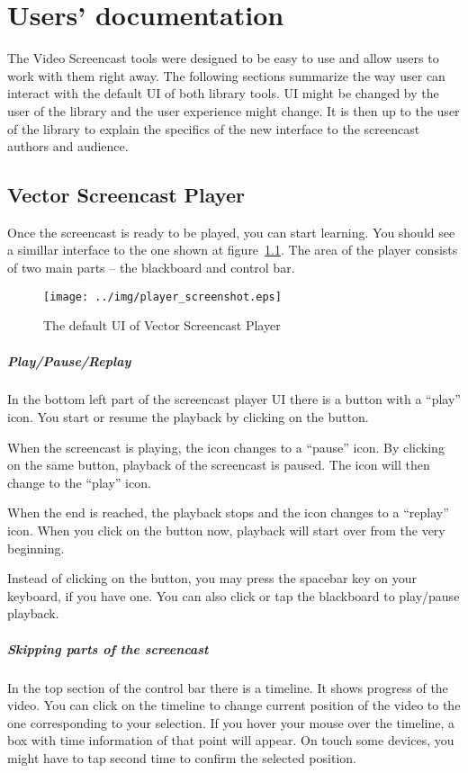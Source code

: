 \chapter{Users' documentation}
The Video Screencast tools were designed to be easy to use and allow users to work with them right away. The following sections summarize the way user can interact with the default UI of both library tools. UI might be changed by the user of the library and the user experience might change. It is then up to the user of the library to explain the specifics of the new interface to the screencast authors and audience.

\section{Vector Screencast Player}
Once the screencast is ready to be played, you can start learning. You should see a simillar interface to the one shown at figure~\ref{fig:player}. The area of the player consists of two main parts -- the blackboard and control bar.

\begin{figure}
	\centering
		\texttt{[image: ../img/player\_screenshot.eps]}
		\label{fig:player}
		\caption{The default UI of Vector Screencast Player}
\end{figure}

\paragraph{Play/Pause/Replay}
In the bottom left part of the screencast player UI there is a button with a ``play'' icon. You start or resume the playback by clicking on the button.

When the screencast is playing, the icon changes to a ``pause'' icon. By clicking on the same button, playback of the screencast is paused. The icon will then change to the ``play'' icon.

When the end is reached, the playback stops and the icon changes to a ``replay'' icon. When you click on the button now, playback will start over from the very beginning.

Instead of clicking on the button, you may press the spacebar key on your keyboard, if you have one. You can also click or tap the blackboard to play/pause playback.

\paragraph{Skipping parts of the screencast}
In the top section of the control bar there is a timeline. It shows progress of the video. You can click on the timeline to change current position of the video to the one corresponding to your selection. If you hover your mouse over the timeline, a box with time information of that point will appear. On touch some devices, you might have to tap second time to confirm the selected position.

